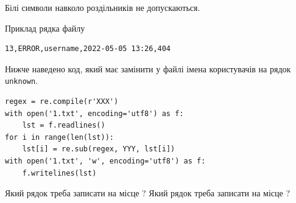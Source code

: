 \documentclass[12pt, ukrainian]{article}
\def\code#1{\Verb!#1!}
\begin{document}
{Білі символи навколо роздільників не допускаються.

Приклад рядка файлу



\begin{verbatim}
13,ERROR,username,2022-05-05 13:26,404
\end{verbatim}


Нижче наведено код, який має замінити у файлі імена користувачів на рядок \code{unknown}.



\begin{verbatim}
regex = re.compile(r'XXX')
with open('1.txt', encoding='utf8') as f:
    lst = f.readlines()
for i in range(len(lst)):
    lst[i] = re.sub(regex, YYY, lst[i])
with open('1.txt', 'w', encoding='utf8') as f:
    f.writelines(lst)
\end{verbatim}





Який рядок треба записати на місце  ?
Який рядок треба записати на місце  ?\par

}
\end{document}
